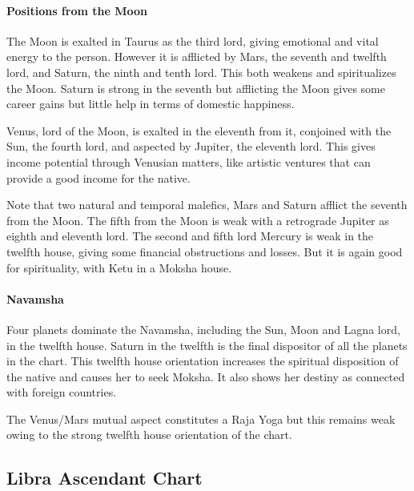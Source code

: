 \paragraph{Positions from the Moon}

 

The Moon is exalted in Taurus as the third lord, giving emotional and vital energy to the person. However it is afflicted by Mars, the seventh and twelfth lord, and Saturn, the ninth and tenth lord. This both weakens and spiritualizes the Moon. Saturn is strong in the seventh but afflicting the Moon gives some career gains but little help in terms of domestic happiness.

 

Venus, lord of the Moon, is exalted in the eleventh from it, conjoined with the Sun, the fourth lord, and aspected by Jupiter, the eleventh lord. This gives income potential through Venusian matters, like artistic ventures that can provide a good income for the native.

 

Note that two natural and temporal malefics, Mars and Saturn afflict the seventh from the Moon. The fifth from the Moon is weak with a retrograde Jupiter as eighth and eleventh lord. The second and fifth lord Mercury is weak in the twelfth house, giving some financial obstructions and losses. But it is again good for spirituality, with Ketu in a Moksha house.

 

\paragraph{Navamsha}

 

Four planets dominate the Navamsha, including the Sun, Moon and Lagna lord, in the twelfth house. Saturn in the twelfth is the final dispositor of all the planets in the chart. This twelfth house orientation increases the spiritual disposition of the native and causes her to seek Moksha. It also shows her destiny as connected with foreign countries.

 

The Venus/Mars mutual aspect constitutes a Raja Yoga but this remains weak owing to the strong twelfth house orientation of the chart.

 

\subsection{Libra Ascendant Chart}
 

